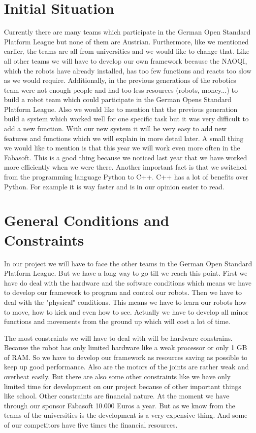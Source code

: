 \documentclass[12pt]{article}
\theoremstyle{definition}
\begin{document}
\pagebreak

\section{Initial Situation}


Currently there are many teams which participate in the German Open Standard Platform League but none of them are Austrian. Furthermore, like we mentioned earlier, the teams are all from universities and we would like to change that. Like all other teams we will have to develop our own framework because the NAOQI, which the robots have already installed, has too few functions and reacts too slow as we would require. Additionally, in the previous generations of the robotics team were not enough people and had too less resources (robots, money...) to build a robot team which could participate in the German Opens Standard Platform League. Also we would like to mention that the previous generation build a system which worked well for one specific task but it was very difficult to add a new function. With our new system it will be very easy to add new features and functions which we will explain in more detail later. A small thing we would like to mention is that this year we will work even more often in the Fabasoft. This is a good thing because we noticed last year that we have worked more efficiently when we were there. Another important fact is that we switched from the programming language Python to C++. C++ has a lot of benefits over Python. For example it is way faster and is in our opinion easier to read. 


\pagebreak

\section{General Conditions and Constraints}

In our project we will have to face the other teams in the German Open Standard Platform League. But we have a long way to go till we reach this point. First we have do deal with the hardware and the software conditions which means we have to develop our framework to program and control our robots. Then we have to deal with the "physical" conditions. This means we have to learn our robots how to move, how to kick and even how to see. Actually we have to develop all minor functions and movements from the ground up which will cost a lot of time.\linebreak

The most constraints we will have to deal with will be hardware constrains. Because the robot has only limited hardware like a weak processor or only 1 GB of RAM. So we have to develop our framework as resources saving as possible to keep up good performance. Also are the motors of the joints are rather weak and overheat easily. But there are also some other constraints like we have only limited time for development on our project because of other important things like school. Other constraints are financial nature. At the moment we have through our sponsor Fabasoft 10.000 Euros a year. But as we know from the teams of the universities is the development is a very expensive thing. And some of our competitors have five times the financial resources.
\end{document}

